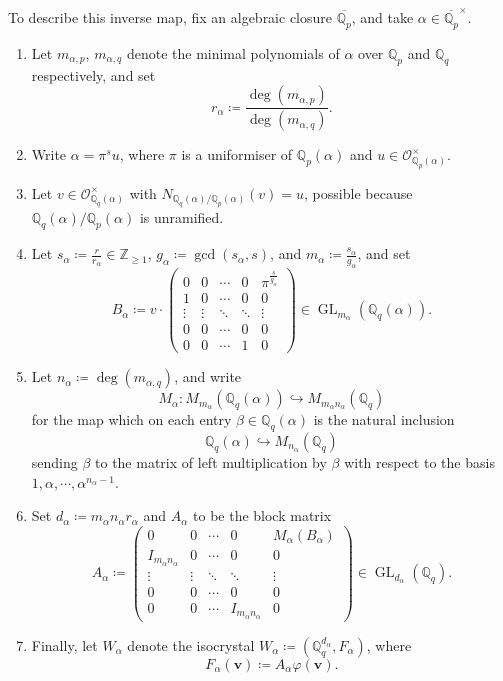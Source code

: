 \documentclass[10pt, reqno, hidelinks]{amsart}
\newcommand{\OO}{\mathcal{O}}
\DeclareMathOperator{\GL}{GL}
\newcommand{\bQ}{{\mathbb Q}}
\newcommand{\bZ}{{\mathbb Z}}
\numberwithin{thm}{subsection}
\theoremstyle{definition}
\begin{document}
To describe this inverse map, fix an algebraic closure $\overline{\bQ_p}$, and take $\alpha \in \overline{\bQ_p}^{\times}$.

\begin{enumerate}
\item Let $m_{\alpha, p}$, $m_{\alpha, q}$ denote the minimal polynomials of $\alpha$ over $\bQ_p$ and $\bQ_q$ respectively, and set
\[
r_{\alpha} \coloneqq \frac{\deg(m_{\alpha, p})}{\deg(m_{\alpha, q})}.
\]
\item Write $\alpha = \pi^s u$, where $\pi$ is a uniformiser of $\bQ_{p}(\alpha)$ and $u \in \OO_{\bQ_p(\alpha)}^{\times}$.
\item Let $v \in \OO_{\bQ_q(\alpha)}^{\times}$ with $N_{\bQ_q(\alpha) / \bQ_p(\alpha)}(v) = u$, possible because $\bQ_q(\alpha) / \bQ_p(\alpha)$ is unramified. 
\item Let $s_{\alpha} \coloneqq \frac{r}{r_{\alpha}} \in \bZ_{\geq 1}$, $g_{\alpha} \coloneqq \gcd(s_{\alpha},s)$, and $m_{\alpha} \coloneqq \frac{s_{\alpha}}{g_{\alpha}}$, and set
\[
B_{\alpha} \coloneqq v \cdot \begin{pmatrix}
    0 & 0 &\cdots & 0 & \pi^{\frac{s}{g_{\alpha}}} \\
    1 & 0 & \cdots & 0 & 0 \\
    \vdots & \vdots & \ddots & \ddots & \vdots \\
    0 & 0 & \cdots & 0 & 0 \\
    0 & 0 & \cdots & 1 & 0
\end{pmatrix} \in \GL_{m_{\alpha}}(\bQ_q(\alpha)).
\]
\item Let $n_{\alpha} \coloneqq \deg(m_{\alpha, q})$, and write
\[
M_{\alpha} \colon M_{m_{\alpha}}(\bQ_q(\alpha)) \hookrightarrow M_{m_{\alpha} n_{\alpha}}(\bQ_q)
\]
for the map which on each entry $\beta \in \bQ_q(\alpha)$ is the natural inclusion 
\[
\bQ_q(\alpha) \hookrightarrow M_{n_{\alpha}}(\bQ_q)
\]
sending $\beta$ to the matrix of left multiplication by $\beta$ with respect to the basis $1, \alpha, \cdots , \alpha^{n_{\alpha}-1}$.
\item Set $d_{\alpha} \coloneqq m_{\alpha} n_{\alpha} r_{\alpha}$ and $A_{\alpha}$ to be the block matrix
\[
A_{\alpha} \coloneqq \begin{pmatrix}
    0 & 0 &\cdots & 0 & M_{\alpha}(B_{\alpha}) \\
    I_{m_{\alpha} n_{\alpha}} & 0 & \cdots & 0 & 0 \\
    \vdots & \vdots & \ddots & \ddots & \vdots \\
    0 & 0 & \cdots & 0 & 0 \\
    0 & 0 & \cdots & I_{m_{\alpha} n_{\alpha}} & 0
\end{pmatrix} \in \GL_{d_{\alpha}}(\bQ_q).
\]
\item Finally, let $W_{\alpha}$ denote the isocrystal $W_{\alpha} \coloneqq (\bQ_q^{d_{\alpha}}, F_{\alpha})$, where
\[
F_{\alpha}(\mathbf{v}) \coloneqq A_{\alpha} \varphi(\mathbf{v}).
\]
\end{enumerate}
\end{document}
